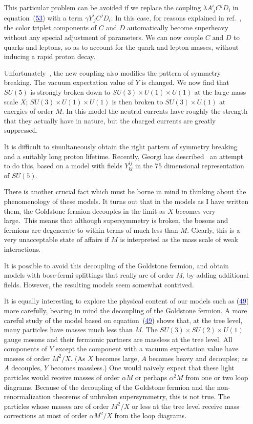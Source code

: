 \documentclass[11pt,a4paper]{article}
\newcommand{\eqnref}[1]{(\hyperlink{eq:#1}{\textcolor{blue}{#1}})}
\begin{document}
This particular problem can be avoided if we replace the coupling
$\lambda A^i_{\ j} C^j D_i$ in equation~\eqnref{53} with a term $\gamma Y^i_{\ j} C^j D_i$. In this case,
for reasons explained in ref.~\cite{ref14}, the color triplet components
of $C$ and $D$ automatically become superheavy without any special
adjustment of parameters. We can now couple $C$ and $D$ to quarks and
leptons, so as to account for the quark and lepton masses, without
inducing a rapid proton decay.

Unfortunately~\cite{ref14}, the new coupling also modifies the pattern of
symmetry breaking. The vacuum expectation value of $Y$ is changed.
We now find that $SU(5)$ is strongly broken down to $SU(3) \times U(1) \times U(1)$
at the large mass scale $X$; $SU(3) \times U(1) \times U(1)$ is then broken to
$SU(3) \times U(1)$ at energies of order $M$. In this model the neutral
currents have roughly the strength that they actually have in nature,
but the charged currents are greatly suppressed.

It is difficult to simultaneously obtain the right pattern of
symmetry breaking and a suitably long proton lifetime. Recently,
Georgi has described~\cite{ref18} an attempt to do this, based on a model with
fields $Y^{ij}_{kl}$ in the 75 dimensional representation of $SU(5)$.

There is another crucial fact which must be borne in mind in
thinking about the phenomenology of these models. It turns out that
in the models as I have written them, the Goldstone fermion decouples
in the limit as $X$ becomes very large.\begingroup\renewcommand{\thefootnote}{\fnsymbol{footnote}}\footnotemark[1]\endgroup\ This means that although
supersymmetry is broken, the bosons and fermions are degenerate to
within terms of much less than $M$. Clearly, this is a very unacceptable
state of affairs if $M$ is interpreted as the mass scale of weak
interactions.

It is possible to avoid this decoupling of the Goldstone fermion,
and obtain models with bose-fermi splittings that really are of order
$M$, by adding additional fields. However, the resulting models seem
somewhat contrived.

It is equally interesting to explore the physical content of
our models such as \eqnref{49} more carefully, bearing in mind the decoupling
of the Goldstone fermion. A more careful study of the model
based on equation~\eqnref{49} shows that, at the tree level, many particles
have masses much less than $M$. The $SU(3) \times SU(2) \times U(1)$ gauge mesons
and their fermionic partners are massless at the tree level. All
components of $Y$ except the component with a vacuum expectation value
have masses of order $M^2/X$. (As $X$ becomes large, $A$ becomes heavy and
decouples; as $A$ decouples, $Y$ becomes massless.) One would naively
expect that these light particles would receive masses of order $\alpha M$
or perhaps $\alpha^2 M$ from one or two loop diagrams. Because of the
decoupling of the Goldstone fermion and the non-renormalization theorems
of unbroken supersymmetry, this is not true. The particles
whose masses are of order $M^2/X$ or less at the tree level receive mass
corrections at most of order $\alpha M^2/X$ from the loop diagrams.
\end{document}
